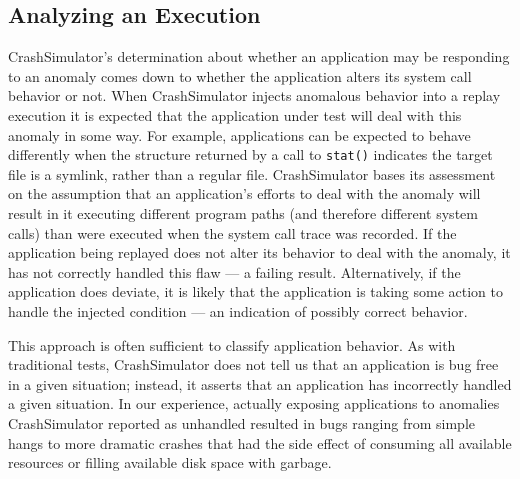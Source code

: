 \subsection{Analyzing an Execution}

CrashSimulator's determination about whether an application may be
responding to an anomaly comes down to whether the application alters its
system call behavior or not.  When CrashSimulator injects anomalous
behavior into a replay execution it is expected that the application under
test will deal with this anomaly in some way. For example, applications can
be expected to behave differently when the structure returned by a call to
{\tt stat()} indicates the target file is a symlink, rather than a regular
file.  CrashSimulator bases its assessment on the assumption that an
application's efforts to deal with the anomaly will result in it executing
different program paths (and therefore different system calls) than were
executed when the system call trace was recorded.  If the application being
replayed does not alter its behavior to deal with the anomaly, it has not
correctly handled this flaw --- a failing result.  Alternatively, if the
application does deviate, it is likely that the application is taking some
action to handle the injected condition --- an indication of possibly
correct behavior.

This approach is often sufficient to classify application behavior.  As
with traditional tests, CrashSimulator does not tell us that an application
is bug free in a given situation; instead, it asserts that an application
has incorrectly handled a given situation.  In our experience, actually
exposing applications to anomalies CrashSimulator reported as unhandled
resulted in bugs ranging from simple hangs to more dramatic crashes that
had the side effect of consuming all available resources or filling
available disk space with garbage.

